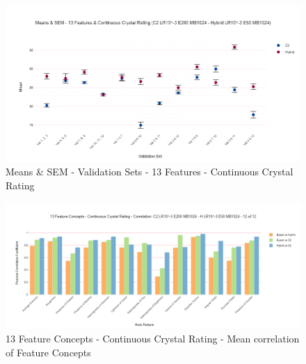 \begin{figure}[H]
  \centering
    \includegraphics[width=\textwidth]{images/Means & SEM - 13 Features & Continuous Crystal Rating (C2 LR10^-3 E200 MB1024 - Hybrid LR10^-3 E50 MB1024).png}
    \caption{Means \& SEM - Validation Sets - 13 Features - Continuous Crystal Rating} \label{fig:Means & SEM - Validation Sets - 13 Features - Continuous Crystal Rating}
\end{figure}


\begin{figure}[H]
  \centering
    \includegraphics[width=\textwidth]{images/13 Feature Concepts - Continuous Crystal Rating - Correlation- C2 LR10^-3 E200 MB1024 - H LR10^-3 E50 MB1024 - 12 of 12.png}
    \caption{13 Feature Concepts - Continuous Crystal Rating - Mean correlation of Feature Concepts} \label{fig:13 Feature Concepts - Continuous Crystal Rating - Mean correlation of Feature Concepts}
\end{figure}


